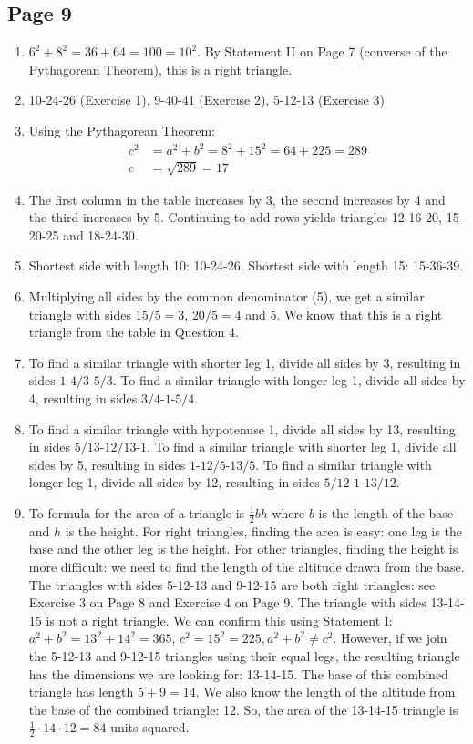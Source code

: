 \documentclass{article}
\newenvironment{solutions}[1]
{\subsection*{#1}
 \begin{enumerate}[leftmargin=1.5em]}
{\end{enumerate}}
\newcommand{\solution}{\item}
\begin{document}
\begin{solutions}{Page 9}
\solution %
$6^2 + 8^2 = 36 + 64 = 100 = 10^2$. By Statement II on Page 7 (converse of the Pythagorean Theorem), this is a right triangle.

\solution %
10-24-26 (Exercise 1), 9-40-41 (Exercise 2), 5-12-13 (Exercise 3)

\solution %
Using the Pythagorean Theorem:
\begin{align*}
c^2 &= a^2 + b^2 = 8^2 + 15^2 = 64 + 225 = 289\\
c   &= \sqrt{289} = 17
\end{align*}

\solution %
The first column in the table increases by 3, the second increases by 4 and the third increases by 5. Continuing to add rows yields triangles 12-16-20, 15-20-25 and 18-24-30.

\solution %
Shortest side with length 10: 10-24-26. Shortest side with length 15: 15-36-39.

\solution %
Multiplying all sides by the common denominator (5), we get a similar triangle with sides $15/5=3$, $20/5=4$ and 5.
We know that this is a right triangle from the table in Question 4.

\solution %
To find a similar triangle with shorter leg 1, divide all sides by 3, resulting in sides $1$-$4/3$-$5/3$.
To find a similar triangle with longer leg 1, divide all sides by 4, resulting in sides $3/4$-$1$-$5/4$.

\solution %
To find a similar triangle with hypotenuse 1, divide all sides by 13, resulting in sides $5/13$-$12/13$-$1$.
To find a similar triangle with shorter leg 1, divide all sides by 5, resulting in sides $1$-$12/5$-$13/5$.
To find a similar triangle with longer leg 1, divide all sides by 12, resulting in sides $5/12$-$1$-$13/12$.

\solution %
To formula for the area of a triangle is $\frac{1}{2}bh$ where $b$ is the length of the base and $h$ is the height.
For right triangles, finding the area is easy: one leg is the base and the other leg is the height.
For other triangles, finding the height is more difficult: we need to find the length of the altitude drawn from the base.
The triangles with sides 5-12-13 and 9-12-15 are both right triangles: see Exercise 3 on Page 8 and Exercise 4 on Page 9.
The triangle with sides 13-14-15 is not a right triangle.
We can confirm this using Statement I: $a^2 + b^2 = 13^2 + 14^2 = 365$, $c^2 = 15^2 = 225, a^2 + b^2 \neq c^2$.
However, if we join the 5-12-13 and 9-12-15 triangles using their equal legs, the resulting triangle has the dimensions we are looking for: 13-14-15.
The base of this combined triangle has length $5 + 9 = 14$. We also know the length of the altitude from the base of the combined triangle: 12.
So, the area of the 13-14-15 triangle is $\frac{1}{2}\cdot14\cdot12 = 84$ units squared.


\end{solutions}
\end{document}
